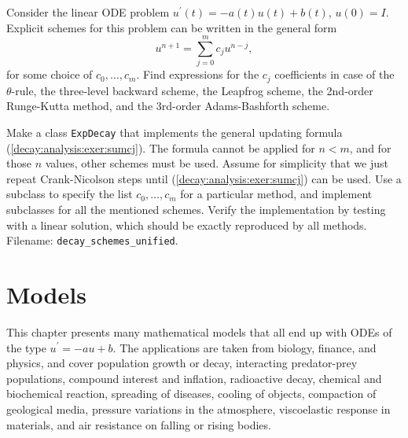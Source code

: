 \documentclass[graybox,sectrefs,envcountresetchap,open=right,final]{svmonodo}
\makeatletter
\newenvironment{doconceexercise}{}{}
\newcounter{doconceexercisecounter}%
\newcommand\listofexercises{
\chapter*{List of Exercises, Problems, and Projects
          \@mkboth{List of Exercises, Problems, and Projects}{List of Exercises, Problems, and Projects}}
\markboth{List of Exercises, Problems, and Projects}{List of Exercises, Problems, and Projects}
\@starttoc{loe}
}
\makeatother
\begin{document}
\begin{doconceexercise}

                
\label{decay:fd2:exer:uni}

Consider the linear ODE problem $u^{\prime}(t)=-a(t)u(t) + b(t)$, $u(0)=I$.
Explicit schemes for this problem can be written in the general form
\begin{equation}
u^{n+1} = \sum_{j=0}^m c_ju^{n-j},
\label{decay:analysis:exer:sumcj}
\end{equation}
for some choice of $c_0,\ldots,c_m$.
Find expressions for the $c_j$ coefficients in case of the
$\theta$-rule, the three-level backward scheme,
the Leapfrog scheme, the 2nd-order Runge-Kutta method,
and the 3rd-order Adams-Bashforth scheme.

Make a class \texttt{ExpDecay} that implements the
general updating formula (\ref{decay:analysis:exer:sumcj}).
The formula cannot be applied for $n < m$, and for those $n$ values, other
schemes must be used. Assume for simplicity that we just
repeat Crank-Nicolson steps until (\ref{decay:analysis:exer:sumcj}) can be used.
Use a subclass
to specify the list $c_0,\ldots,c_m$ for a particular method, and
implement subclasses for all the mentioned schemes.
Verify the implementation by testing with a linear solution, which should
be exactly reproduced by all methods.
\noindent Filename: \Verb!decay_schemes_unified!.

\end{doconceexercise}

\chapter{Models}
\label{decay:app}

This chapter presents many mathematical models that all end up with
ODEs of the type $u^{\prime}=-au+b$.  The applications are taken from
biology, finance, and physics, and cover population growth or decay,
interacting predator-prey populations, compound interest and
inflation, radioactive decay, chemical and biochemical reaction,
spreading of diseases, cooling of objects, compaction of geological
media, pressure variations in the atmosphere, viscoelastic response in
materials, and air resistance on falling or rising bodies.
\end{document}
